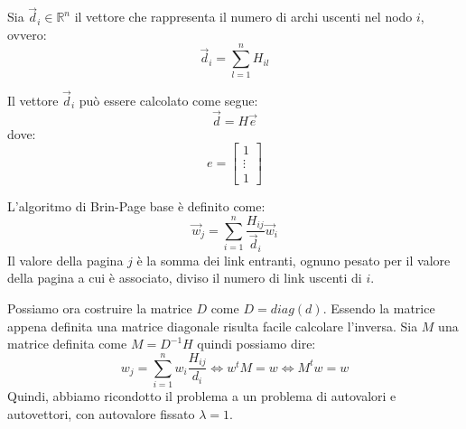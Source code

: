 Sia $\vec{d}_i \in \mathbb{R}^n$ il vettore che rappresenta il numero di archi
uscenti nel nodo $i$, ovvero:
\begin{equation}
    \vec{d}_i = \sum_{l = 1}^n H_{il}
\end{equation}
\begin{nota}
    Il vettore $\vec{d}_i$ può essere calcolato come segue:
    \begin{equation}
        \vec{d} = H \vec{e}
    \end{equation}
    dove:
    \begin{equation}
        e = \left[\begin{array}{c}
                1      \\
                \vdots \\
                1
            \end{array} \right]
    \end{equation}
\end{nota}
L'algoritmo di Brin-Page base è definito come:
\begin{equation}
    \vec{w}_j = \sum_{i = 1}^n \frac{H_{ij}}{\vec{d}_i} \vec{w}_i
\end{equation}
Il valore della pagina $j$ è la somma dei link entranti, ognuno pesato per il
valore della pagina a cui è associato, diviso il numero di link uscenti di $i$.

Possiamo ora costruire la matrice $D$ come $D = diag(d)$. Essendo la matrice
appena definita una matrice diagonale risulta facile calcolare l'inversa. Sia $M$
una matrice definita come $M= D^{-1}H$ quindi possiamo dire:
\begin{equation}
    w_j = \sum_{i=1}^n w_i \frac{H_{ij}}{d_i} \iff w^t M = w \iff M^t w=w
\end{equation}
Quindi, abbiamo ricondotto il problema a un problema di autovalori e autovettori,
con autovalore fissato $\lambda = 1$.

